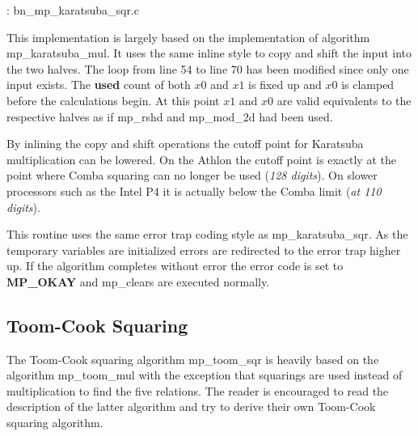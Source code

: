 \documentclass[b5paper]{book}
\begin{document}
\vspace{+3mm}\begin{small}
\hspace{-5.1mm}{\bf File}: bn\_mp\_karatsuba\_sqr.c
\vspace{-3mm}
\begin{alltt}
\end{alltt}
\end{small}

This implementation is largely based on the implementation of algorithm mp\_karatsuba\_mul.  It uses the same inline style to copy and 
shift the input into the two halves.  The loop from line 54 to line 70 has been modified since only one input exists.  The \textbf{used}
count of both $x0$ and $x1$ is fixed up and $x0$ is clamped before the calculations begin.  At this point $x1$ and $x0$ are valid equivalents
to the respective halves as if mp\_rshd and mp\_mod\_2d had been used.  

By inlining the copy and shift operations the cutoff point for Karatsuba multiplication can be lowered.  On the Athlon the cutoff point
is exactly at the point where Comba squaring can no longer be used (\textit{128 digits}).  On slower processors such as the Intel P4
it is actually below the Comba limit (\textit{at 110 digits}).

This routine uses the same error trap coding style as mp\_karatsuba\_sqr.  As the temporary variables are initialized errors are 
redirected to the error trap higher up.  If the algorithm completes without error the error code is set to \textbf{MP\_OKAY} and 
mp\_clears are executed normally.

\subsection{Toom-Cook Squaring}
The Toom-Cook squaring algorithm mp\_toom\_sqr is heavily based on the algorithm mp\_toom\_mul with the exception that squarings are used
instead of multiplication to find the five relations.  The reader is encouraged to read the description of the latter algorithm and try to 
derive their own Toom-Cook squaring algorithm.  
\end{document}
